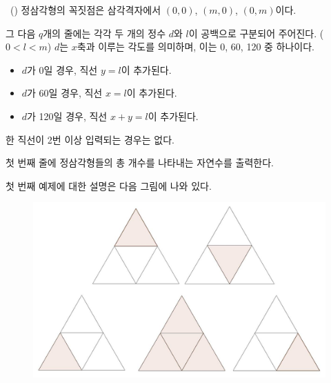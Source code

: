 \begin{problem}{\kcpcpprobtriangle\ (\kcpcpprobtriangleshort)}
    정삼각형의 꼭짓점은 삼각격자에서 $ (0,0) $, $ (m,0) $, $ (0,m) $이다.
    
    그 다음 $ q $개의 줄에는 각각 두 개의 정수 $ d $와 $ l $이 공백으로 구분되어 주어진다. ($ 0 < l < m $) $ d $는 $ x $축과 이루는 각도를 의미하며, 이는 0, 60, 120 중 하나이다.
    
    \begin{itemize}
        \item $ d $가 0일 경우, 직선 $ y=l $이 추가된다.
        \item $ d $가 60일 경우, 직선 $ x=l $이 추가된다.
        \item $ d $가 120일 경우, 직선 $ x+y=l $이 추가된다. 
    \end{itemize}
    
    한 직선이 2번 이상 입력되는 경우는 없다.
    
    \OutputFile
    
    첫 번째 줄에 정삼각형들의 총 개수를 나타내는 자연수를 출력한다.
    
    \Examples
    \begin{example}
    \end{example}

    \Explanation
    첫 번째 예제에 대한 설명은 다음 그림에 나와 있다.
    \begin{figure}[h]
        \centering
        \includegraphics[height=0.25\textheight]{./problems/triangle-pic2.jpg}
    \end{figure}
    
\end{problem}

